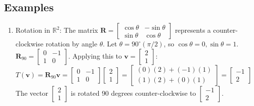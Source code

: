 \documentclass{article}
\newcommand{\vect}[1]{\bm{#1}} %
\newcommand{\mat}[1]{\bm{#1}}  %
\newcommand{\R}{\mathbb{R}}    %
\begin{document}
\subsection*{Examples}
\begin{enumerate}
    \item Rotation in $\R^2$: The matrix $\mat{R} = \begin{bmatrix} \cos \theta & -\sin \theta \\ \sin \theta & \cos \theta \end{bmatrix}$ represents a counter-clockwise rotation by angle $\theta$. Let $\theta = 90^\circ (\pi/2)$, so $\cos \theta = 0, \sin \theta = 1$. $\mat{R}_{90} = \begin{bmatrix} 0 & -1 \\ 1 & 0 \end{bmatrix}$. Applying this to $\vect{v} = \begin{bmatrix} 2 \\ 1 \end{bmatrix}$:
    \[ T(\vect{v}) = \mat{R}_{90}\vect{v} = \begin{bmatrix} 0 & -1 \\ 1 & 0 \end{bmatrix} \begin{bmatrix} 2 \\ 1 \end{bmatrix} = \begin{bmatrix} (0)(2)+(-1)(1) \\ (1)(2)+(0)(1) \end{bmatrix} = \begin{bmatrix} -1 \\ 2 \end{bmatrix} \]
    The vector $\begin{bmatrix} 2 \\ 1 \end{bmatrix}$ is rotated 90 degrees counter-clockwise to $\begin{bmatrix} -1 \\ 2 \end{bmatrix}$.


\end{enumerate}
\end{document}
